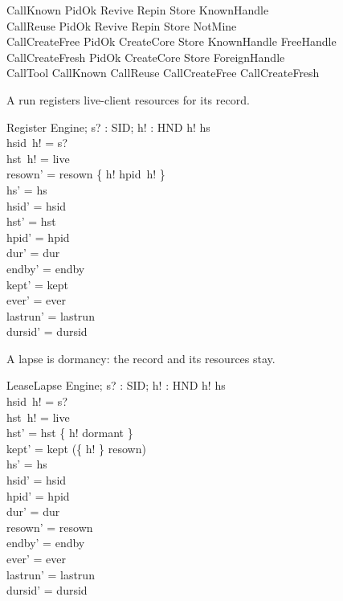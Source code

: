 \documentclass[a4paper,10pt,fleqn]{article}
\begin{document}
\begin{zed}
  CallKnown  PidOk \land Revive \land Repin \land Store \land KnownHandle \\
  CallReuse  PidOk \land Revive \land Repin \land Store \land NotMine \\
  CallCreateFree 
    PidOk \land CreateCore \land Store \land KnownHandle \land FreeHandle \\
  CallCreateFresh  PidOk \land CreateCore \land Store \land ForeignHandle \\
  CallTool  CallKnown \lor CallReuse \lor CallCreateFree \lor CallCreateFresh
\end{zed}

A run registers live-client resources for its record.

\begin{schema}{Register}
  \Delta Engine; s? : SID; h! : HND
\where
  h! \in hs \\
  hsid~h! = s? \\
  hst~h! = live \\
  resown' = resown \oplus \{ h! \mapsto hpid~h! \} \\
  hs' = hs \\
  hsid' = hsid \\
  hst' = hst \\
  hpid' = hpid \\
  dur' = dur \\
  endby' = endby \\
  kept' = kept \\
  ever' = ever \\
  lastrun' = lastrun \\
  dursid' = dursid
\end{schema}

A lapse is dormancy: the record and its resources stay.

\begin{schema}{LeaseLapse}
  \Delta Engine; s? : SID; h! : HND
\where
  h! \in hs \\
  hsid~h! = s? \\
  hst~h! = live \\
  hst' = hst \oplus \{ h! \mapsto dormant \} \\
  kept' = kept \cup (\{ h! \} \cap \dom resown) \\
  hs' = hs \\
  hsid' = hsid \\
  hpid' = hpid \\
  dur' = dur \\
  resown' = resown \\
  endby' = endby \\
  ever' = ever \\
  lastrun' = lastrun \\
  dursid' = dursid
\end{schema}
\end{document}
